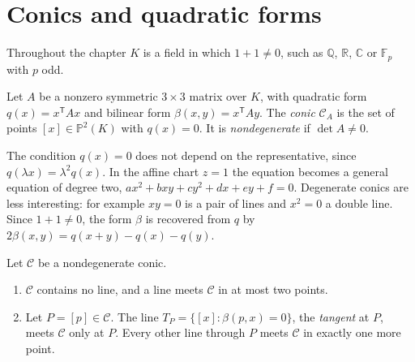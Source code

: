 \section{Conics and quadratic forms}

Throughout the chapter $K$ is a field in which $1+1\ne0$, such as $\mathbb Q$, $\mathbb R$, $\mathbb C$ or $\mathbb F_p$ with $p$ odd.

\begin{definition}\label{geometry:def:conic}
Let $A$ be a nonzero symmetric $3\times3$ matrix over $K$, with quadratic form $q(x)=x^{\mathsf T}Ax$ and bilinear form $\beta(x,y)=x^{\mathsf T}Ay$.
The \emph{conic} $\mathcal C_A$ is the set of points $[x]\in\mathbb P^2(K)$ with $q(x)=0$. It is \emph{nondegenerate} if $\det A\ne0$.
\end{definition}

The condition $q(x)=0$ does not depend on the representative, since $q(\lambda x)=\lambda^2q(x)$. In the affine chart $z=1$ the equation becomes a
general equation of degree two, $ax^2+bxy+cy^2+dx+ey+f=0$. Degenerate conics are less interesting: for example $xy=0$ is a pair of lines and $x^2=0$ a
double line. Since $1+1\ne0$, the form $\beta$ is recovered from $q$ by $2\beta(x,y)=q(x+y)-q(x)-q(y)$.

\begin{proposition}\label{geometry:prop:conicline}
Let $\mathcal C$ be a nondegenerate conic.
\begin{enumerate}
\item $\mathcal C$ contains no line, and a line meets $\mathcal C$ in at most two points.
\item Let $P=[p]\in\mathcal C$. The line $T_P=\{[x]:\beta(p,x)=0\}$, the \emph{tangent} at $P$, meets $\mathcal C$ only at $P$. Every other line through
$P$ meets $\mathcal C$ in exactly one more point.
\end{enumerate}
\end{proposition}

